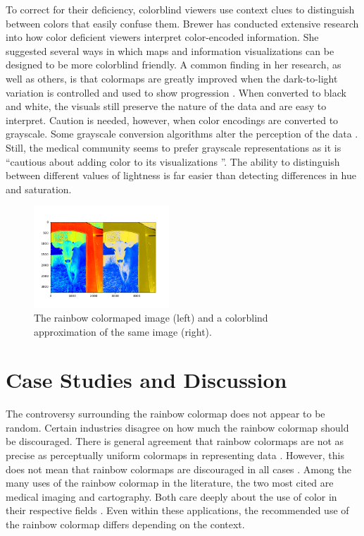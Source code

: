 \documentclass[journal,12pt]{IEEEtran}
\begin{document}
To correct for their deficiency, colorblind viewers use context
clues to distinguish between colors that easily confuse them.
Brewer has conducted extensive research into how color deficient
viewers interpret color-encoded information. She suggested several ways in which 
maps and information visualizations can be designed to be more colorblind friendly.
A common finding in her research, as well as others, is that colormaps are greatly
improved when the dark-to-light variation is controlled and used to show progression \cite{mapcvi}.
When converted to black and white, the visuals still preserve the nature of the data and are easy to interpret.
Caution is needed, however, when color encodings are converted to
grayscale. Some grayscale conversion algorithms alter the perception of the data \cite{colorvblackwhite}.
Still, the medical community seems to prefer grayscale representations as it is ``cautious about adding color
to its visualizations \cite{endofrainbow}''. The ability to distinguish between different values of lightness is
far easier than detecting differences in hue and saturation.

\begin{figure}
\centering
\includegraphics[width=2in]{colorblind_rainbow1.png}%
\caption{The rainbow colormaped image (left) and a colorblind approximation of the same image (right).}
\end{figure}

\section{Case Studies and Discussion}

The controversy surrounding the rainbow colormap does not appear to be random.
Certain industries disagree on how much the rainbow colormap should be 
discouraged. There is general agreement that rainbow colormaps are not as 
precise as perceptually uniform colormaps in representing data 
\cite{colorvblackwhite}. However, this 
does not mean that rainbow colormaps are discouraged in all cases
 \cite{spectralschemes}. 
Among the many uses of the rainbow colormap in the
literature, the two most cited are
medical imaging and cartography. Both care deeply about the use of color in 
their respective fields \cite{colorguidelines, standardmedimg}. Even within
 these applications, the recommended use of the rainbow colormap differs
 depending on the context.
 
\end{document}

